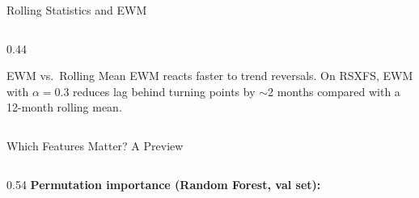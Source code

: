 \documentclass[aspectratio=169, 10pt]{beamer}
\begin{document}
\begin{frame}{Rolling Statistics and EWM}
\begin{columns}[T]
\begin{column}{0.44\textwidth}
      \smallskip
      \begin{examplebox}{EWM vs.\ Rolling Mean}
        \footnotesize
        EWM reacts faster to trend reversals.
        On RSXFS, EWM with $\alpha=0.3$ reduces
        lag behind turning points by $\sim$2 months
        compared with a 12-month rolling mean.
      \end{examplebox}
    \end{column}
  \end{columns}
\end{frame}

\begin{frame}{Which Features Matter? A Preview}
  \begin{columns}[T]
    \begin{column}{0.54\textwidth}
      \textbf{Permutation importance (Random Forest, val set):}


\end{column}
\end{columns}
\end{frame}
\end{document}
